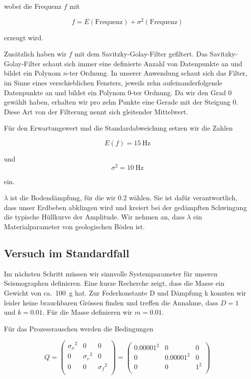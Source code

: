 wobei die Frequenz $f$ mit

\begin{equation}
	f = E(\mathrm{Frequenz}) + \sigma^2(\mathrm{Frequenz})
\end{equation}

erzeugt wird.

Zusätzlich haben wir $f$ mit dem Savitzky-Golay-Filter gefiltert.
Das Savitzky-Golay-Filter schaut sich immer eine definierte Anzahl von Datenpunkte an
und bildet ein Polynom $n$-ter Ordnung.
In unserer Anwendung schaut sich das Filter, im Sinne eines verschieblichen Fensters,
jeweils zehn aufeinanderfolgende Datenpunkte an und bildet ein Polynom $0$-ter Ordnung.
Da wir den Grad $0$ gewählt haben, erhalten wir pro zehn Punkte eine Gerade mit der Steigung $0$.
Diese Art von der Filterung nennt sich gleitender Mittelwert.

Für den Erwartungswert und die Standardabweichung setzen wir die Zahlen

\begin{equation}
E(f) = \SI{15}{\hertz}
\end{equation}

und
\begin{equation}
\sigma^2 = \SI{10}{\hertz}
\end{equation}

ein.

$\lambda$ ist die Bodendämpfung, für die wir $0.2$ wählen.
Sie ist dafür verantwortlich, dass unser Erdbeben abklingen wird und kreiert bei der gedämpften Schwingung die typische Hüllkurve der Amplitude.
Wir nehmen an, dass $\lambda$ ein Materialparameter von geologischen Böden ist.

\subsection{Versuch im Standardfall}
Im nächsten Schritt müssen wir sinnvolle Systemparameter für unseren Seismographen definieren.
Eine kurze Recherche zeigt, dass die Masse ein Gewicht von ca.\ \SI{100}{\gram} hat.
Zur Federkonstante D und Dämpfung k konnten wir leider keine brauchbaren Grössen finden und treffen die Annahme, dass $D = 1$ und $k = 0.01$.
Für die Masse definieren wir $m = 0.01$.

Für das Prozessrauschen werden die Bedingungen

\begin{equation}
	Q = \left(
	\begin{array}{ccc}
		{\sigma_x }^2& 0& 0 \\
		0 & {\sigma_v }^2& 0\\
		0 & 0& {\sigma_f }^2\\
	\end{array}\right)= \left(
	\begin{array}{ccc}
		{0.00001}^2& 0& 0 \\
		0 & {0.00001}^2& 0\\
		0 & 0& {1 }^2\\
	\end{array}\right)
\end{equation}

